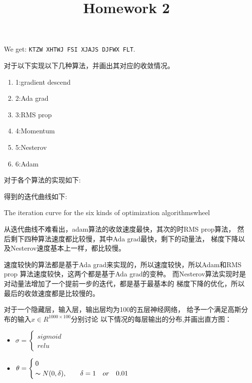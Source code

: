 \documentclass{homework}
\begin{document}


We get: \texttt{KTZW XHTWJ FSI XJAJS DJFWX FLT}.

\fi 


\title{ Homework 2}

\question 对于以下实现以下几种算法，并画出其对应的收敛情况。
\begin{enumerate}
	\item 1:gradient descend
	\item 2:Ada grad
	\item 3:RMS prop
	\item 4:Momentum
	\item 5:Nesterov
	\item  6:Adam
\end{enumerate}

对于各个算法的实现如下:




得到的迭代曲线如下:

{The iteration curve for the six kinds of optimization algorithms}{wheel}



从迭代曲线不难看出，adam算法的收敛速度最快，其次的时RMS prop算法，
然后剩下四种算法速度都比较慢，其中Ada grad最快，剩下的动量法，
梯度下降以及Nesterov速度基本上一样，都比较慢。

速度较快的算法都是基于Ada grad来实现的，所以速度较快，所以Adam和RMS prop
算法速度较快，这两个都是基于Ada grad的变种。
而Nesterov算法实现时是对动量法增加了一个提前一步的迭代，都是基于最基本的
梯度下降的优化，所以最后的收敛速度都是比较慢的。


\question 对于一个隐藏层，输入层，输出层均为100的五层神经网络，
给予一个满足高斯分布的输入$x\in R^{1000\times 100}$分别讨论
以下情况的每层输出的分布,并画出直方图：
\begin{itemize}
	\item  $\sigma = \begin{cases}
  sigmoid \\ relu \end{cases}$
	\item  $\theta = \begin{cases}
		0 \\   \thicksim N(0, \delta) ,\qquad \delta = 1 \quad or \quad 0.01 \end{cases}$
\end{itemize}




\end{document}
